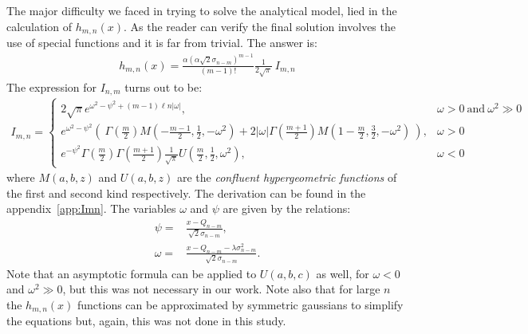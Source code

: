\documentclass[a4paper,11pt]{article}
\begin{document}
The major difficulty we faced in trying to solve the analytical model, lied in the calculation of $h_{m,n}(x)$. 
As the reader can verify the final solution involves the use of special functions and it is far from trivial. 
The answer is:
\begin{align}
h_{m,n}(x) =  \frac{\alpha (\alpha\sqrt{2} \sigma_{n-m})^{m-1}}{(m-1)!} \frac{1}{2\sqrt{\pi}} \  I_{m,n}
\end{align}  
The expression for $I_{n,m}$ turns out to be:
\begin{align}
I_{m,n} = 
\begin{cases}
2\sqrt{\pi}   e^{\omega^2 - \psi^2 + (m-1) \ell n |\omega|},  & \omega>0 \ \text{and} \  \omega^2 \gg 0\\
e^{\omega^2 -\psi^2 } \left(\  \Gamma\left( \frac{m}{2} \right) M\left(-\frac{m-1}{2}, \frac{1}{2}, -\omega^2 \right)  
+ 2|\omega| \Gamma\left( \frac{m+1}{2} \right) M\left(1-\frac{m}{2}, \frac{3}{2}, -\omega^2 \right)   \    \right), &  \omega > 0  \\
e^{ -\psi^2 } \Gamma\left( \frac{m}{2} \right)   \Gamma\left( \frac{m+1}{2} \right) \frac{1}{\sqrt{\pi}} U\left( \frac{m}{2}, \frac{1}{2}, \omega^2  \right), & \omega<0
\end{cases}
\nonumber
\end{align} 
where $M(a,b,z)$ and $U(a,b,z)$ are the \emph{confluent hypergeometric functions} of the first and second kind respectively. 
The derivation can be found in the appendix~\ref{app:Imn}. 
The variables $\omega$ and $\psi$ are given by the relations:
\begin{align}
\psi = & \frac{x-Q_{n-m}}{\sqrt{2}\sigma_{n-m}}, \\
\omega = & \frac{x-Q_{n-m} -\lambda\sigma^2_{n-m}}{\sqrt{2}\sigma_{n-m}}.
\end{align}  
Note that an asymptotic formula can be applied to $U(a,b,c)$ as well, for $\omega < 0$ and $\omega^2 \gg 0$, but this was not necessary in our work. 
Note also that for large $n$ the $h_{m,n}(x)$ functions can be approximated by symmetric gaussians to simplify the equations but, again, this was not done in this study. 
\end{document}
